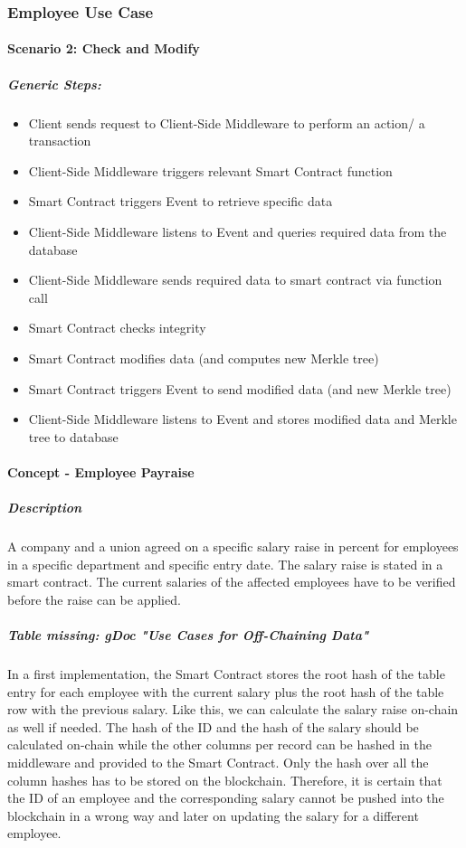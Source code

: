 \subsubsection{Employee Use Case}
\paragraph{Scenario 2: Check and Modify}
\subparagraph{Generic Steps:}
\begin{itemize}
\item Client sends request to Client-Side Middleware to perform an action/ a transaction
\item Client-Side Middleware triggers relevant Smart Contract function
\item Smart Contract triggers Event to retrieve specific data
\item Client-Side Middleware listens to Event and queries required data from the database
\item Client-Side Middleware sends required data to smart contract via function call
\item Smart Contract checks integrity
\item Smart Contract modifies data (and computes new Merkle tree)
\item Smart Contract triggers Event to send modified data (and new Merkle tree)
\item Client-Side Middleware listens to Event and stores modified data and Merkle tree to database
\end{itemize}

\paragraph{Concept - Employee Payraise}
\subparagraph{Description}
A company and a union agreed on a specific salary raise in percent for employees in a specific department and specific entry date. The salary raise is stated in a smart contract. The current salaries of the affected employees have to be verified before the raise can be applied.

\subparagraph{Table missing: gDoc "Use Cases for Off-Chaining Data"}

In a first implementation, the Smart Contract stores the root hash of the table entry for each employee with the current salary plus the root hash of the table row with the previous salary. Like this, we can calculate the salary raise on-chain as well if needed.
The hash of the ID and the hash of the salary should be calculated on-chain while the other columns per record can be hashed in the middleware and provided to the Smart Contract. Only the hash over all the column hashes has to be stored on the blockchain. Therefore, it is certain that the ID of an employee and the corresponding salary cannot be pushed into the blockchain in a wrong way and later on updating the salary for a different employee.

